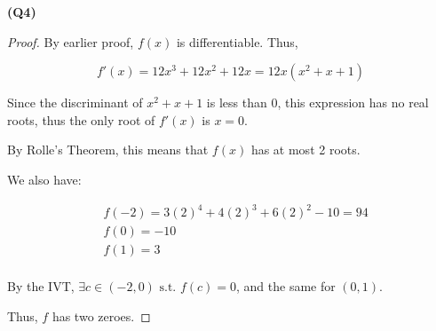 \documentclass[12pt, a4paper]{article}
\newcommand{\st}{\text{ s.t. }}
\begin{document}
\textbf{(Q4)}

\begin{proof}
    By earlier proof, $f(x)$ is differentiable. Thus,

    \[
        f'(x) = 12x^3 + 12x^2 + 12x = 12x(x^2 + x + 1)
    \]

    Since the discriminant of $x^2 + x + 1$ is less than 0, this
    expression has no real roots, thus the only root of $f'(x)$ is $x = 0$.

    By Rolle's Theorem, this means that $f(x)$ has at most 2 roots.

    We also have:

    \begin{align*}
        & f(-2) = 3(2)^4 + 4(2)^3 + 6(2)^2 - 10 = 94\\
        & f(0) = -10\\
        & f(1) = 3\\
    \end{align*}

    By the IVT, $\exists c \in (-2, 0) \st f(c) = 0$, and the same for $(0, 1)$.

    Thus, $f$ has two zeroes.
\end{proof}
\end{document}
